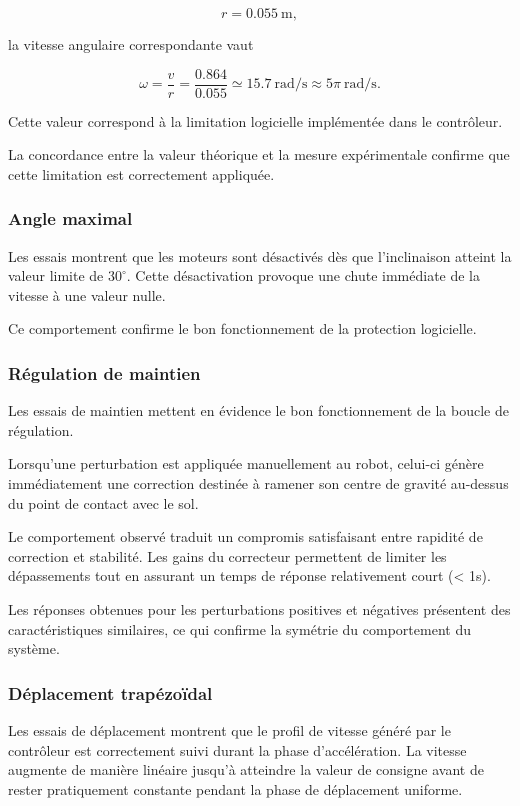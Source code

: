 \[
r=0.055~\si{\meter},
\]

la vitesse angulaire correspondante vaut

\[
\omega=\frac{v}{r}
=\frac{0.864}{0.055}
\simeq15.7~\si{\radian\per\second}
\approx5\pi~\si{\radian\per\second}.
\]

Cette valeur correspond à la limitation logicielle implémentée dans le contrôleur.

La concordance entre la valeur théorique et la mesure expérimentale confirme que cette limitation est correctement appliquée.

\subsubsection{Angle maximal}

Les essais montrent que les moteurs sont désactivés dès que l'inclinaison atteint la valeur limite de $30^\circ$. Cette désactivation provoque une chute immédiate de la vitesse à une valeur nulle.

Ce comportement confirme le bon fonctionnement de la protection logicielle. 

\subsubsection{Régulation de maintien}

Les essais de maintien mettent en évidence le bon fonctionnement de la boucle de régulation.

Lorsqu'une perturbation est appliquée manuellement au robot, celui-ci génère immédiatement une correction destinée à ramener son centre de gravité au-dessus du point de contact avec le sol.

Le comportement observé traduit un compromis satisfaisant entre rapidité de correction et stabilité. Les gains du correcteur permettent de limiter les dépassements tout en assurant un temps de réponse relativement court (< 1s).

Les réponses obtenues pour les perturbations positives et négatives présentent des caractéristiques similaires, ce qui confirme la symétrie du comportement du système.

\subsubsection{Déplacement trapézoïdal}

Les essais de déplacement montrent que le profil de vitesse généré par le contrôleur est correctement suivi durant la phase d'accélération. La vitesse augmente de manière linéaire jusqu'à atteindre la valeur de consigne avant de rester pratiquement constante pendant la phase de déplacement uniforme.

